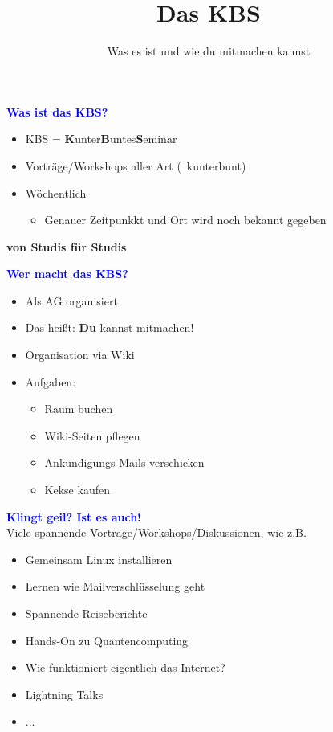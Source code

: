 \documentclass[t]{beamer}
\title{Das KBS}
\subtitle{Was es ist und wie du mitmachen kannst}
\date{}
\newcommand{\heading}[1]{{\Large\bfseries\vspace{1cm}\textcolor{blue}{#1}\\\vspace{0.65cm}}}
\begin{document}
	{
		\vspace*{-0.65cm}
		\maketitle
		\addtocounter{page}{-1}
	}
	
	\begin{frame}[plain]
		\heading{Was ist das KBS?}
		\begin{itemize}
			\item KBS = \textbf{K}unter\textbf{B}untes\textbf{S}eminar
			\item Vorträge/Workshops aller Art (\textrightarrow\ kunterbunt)
			\item Wöchentlich
			\begin{itemize}
				\item Genauer Zeitpunkkt und Ort wird noch bekannt gegeben
			\end{itemize}
		\end{itemize}
		\vspace{1cm}
		\pause
		\begin{center}
			\textbf{von Studis für Studis}
		\end{center}
	\end{frame}
	
	\begin{frame}[plain]
		\heading{Wer macht das KBS?}
		\begin{itemize}
			\item Als AG organisiert
			\item Das heißt: \textbf{Du} kannst mitmachen!
			\item Organisation via Wiki
			\item Aufgaben:
			\begin{itemize}
				\item Raum buchen
				\item Wiki-Seiten pflegen
				\item Ankündigungs-Mails verschicken
				\item Kekse kaufen
			\end{itemize}
		\end{itemize}
	\end{frame}
	
	\begin{frame}[plain]
		\heading{Klingt geil? Ist es auch!}
		Viele spannende Vorträge/Workshops/Diskussionen, wie z.B.
		\begin{itemize}
			\item Gemeinsam Linux installieren
			\item Lernen wie Mailverschlüsselung geht
			\item Spannende Reiseberichte
			\item Hands-On zu Quantencomputing
			\item Wie funktioniert eigentlich das Internet?
			\item Lightning Talks
			\item ...
		\end{itemize}
	\end{frame}
	
\end{document}
